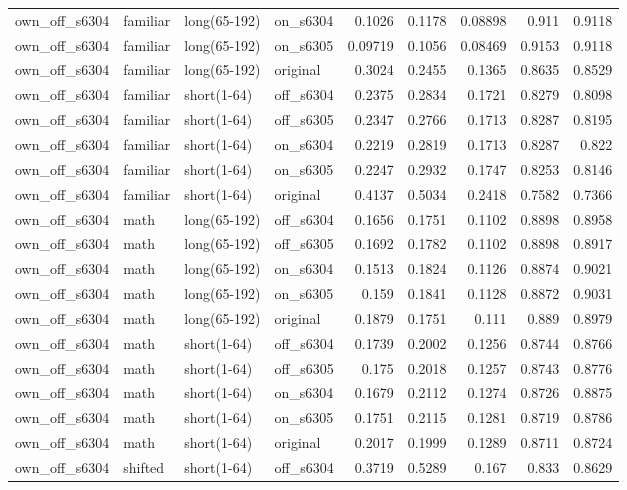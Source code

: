 \begin{table}
\begin{tabular}{llllrrrrr}
own\_off\_s6304 & familiar & long(65-192) & on\_s6304 & 0.1026 & 0.1178 & 0.08898 & 0.911 & 0.9118 \\
own\_off\_s6304 & familiar & long(65-192) & on\_s6305 & 0.09719 & 0.1056 & 0.08469 & 0.9153 & 0.9118 \\
own\_off\_s6304 & familiar & long(65-192) & original & 0.3024 & 0.2455 & 0.1365 & 0.8635 & 0.8529 \\
own\_off\_s6304 & familiar & short(1-64) & off\_s6304 & 0.2375 & 0.2834 & 0.1721 & 0.8279 & 0.8098 \\
own\_off\_s6304 & familiar & short(1-64) & off\_s6305 & 0.2347 & 0.2766 & 0.1713 & 0.8287 & 0.8195 \\
own\_off\_s6304 & familiar & short(1-64) & on\_s6304 & 0.2219 & 0.2819 & 0.1713 & 0.8287 & 0.822 \\
own\_off\_s6304 & familiar & short(1-64) & on\_s6305 & 0.2247 & 0.2932 & 0.1747 & 0.8253 & 0.8146 \\
own\_off\_s6304 & familiar & short(1-64) & original & 0.4137 & 0.5034 & 0.2418 & 0.7582 & 0.7366 \\
own\_off\_s6304 & math & long(65-192) & off\_s6304 & 0.1656 & 0.1751 & 0.1102 & 0.8898 & 0.8958 \\
own\_off\_s6304 & math & long(65-192) & off\_s6305 & 0.1692 & 0.1782 & 0.1102 & 0.8898 & 0.8917 \\
own\_off\_s6304 & math & long(65-192) & on\_s6304 & 0.1513 & 0.1824 & 0.1126 & 0.8874 & 0.9021 \\
own\_off\_s6304 & math & long(65-192) & on\_s6305 & 0.159 & 0.1841 & 0.1128 & 0.8872 & 0.9031 \\
own\_off\_s6304 & math & long(65-192) & original & 0.1879 & 0.1751 & 0.111 & 0.889 & 0.8979 \\
own\_off\_s6304 & math & short(1-64) & off\_s6304 & 0.1739 & 0.2002 & 0.1256 & 0.8744 & 0.8766 \\
own\_off\_s6304 & math & short(1-64) & off\_s6305 & 0.175 & 0.2018 & 0.1257 & 0.8743 & 0.8776 \\
own\_off\_s6304 & math & short(1-64) & on\_s6304 & 0.1679 & 0.2112 & 0.1274 & 0.8726 & 0.8875 \\
own\_off\_s6304 & math & short(1-64) & on\_s6305 & 0.1751 & 0.2115 & 0.1281 & 0.8719 & 0.8786 \\
own\_off\_s6304 & math & short(1-64) & original & 0.2017 & 0.1999 & 0.1289 & 0.8711 & 0.8724 \\
own\_off\_s6304 & shifted & short(1-64) & off\_s6304 & 0.3719 & 0.5289 & 0.167 & 0.833 & 0.8629 \\

\end{tabular}
\end{table}
